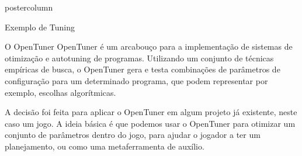 \documentclass[final]{beamer}
\begin{document}
\begin{frame}
\begin{columns}
\begin{column}{.5\textwidth}
\begin{beamercolorbox}[center,wd=\textwidth]{postercolumn}
\begin{minipage}[T]{.95\textwidth}
{            \begin{block}{Exemplo de Tuning}
                \center 
                                
                \vspace*{0.2cm}
            \end{block}
            
            \vspace*{0.2cm}

            \begin{block}{O OpenTuner}
            \justifying
                OpenTuner é um arcabouço para a implementação de sistemas de otimização e autotuning de programas. Utilizando um conjunto de técnicas empíricas de busca, o OpenTuner gera e testa combinações de parâmetros de configuração para um determinado programa, que podem representar por exemplo, escolhas algorítmicas. 
                
                \vspace*{0.4cm} 
                
                
                \vspace*{0.2cm} 
                
                A decisão foi feita para aplicar o OpenTuner em algum projeto já existente, neste caso um jogo. A ideia básica é que podemos usar o OpenTuner para otimizar um conjunto de parâmetros dentro do jogo, para ajudar o jogador a ter um planejamento, ou como uma metaferramenta de auxílio.
                               
                \vspace*{0.2cm} 
            \end{block}
          }
        \end{minipage}
      \end{beamercolorbox}
    \end{column}


\end{columns}
\end{frame}
\end{document}

